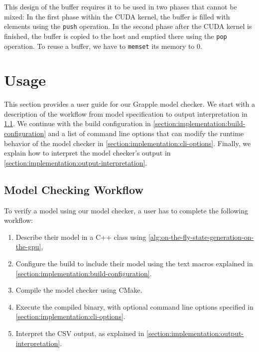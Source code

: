 \documentclass[
fancyheadings, %
%
%
]{stsreprt}
\begin{document}
This design of the buffer requires it to be used in two phases that cannot be mixed:
In the first phase within the CUDA kernel, the buffer is filled with elements using the \texttt{push} operation.
In the second phase after the CUDA kernel is finished, the buffer is copied to the host and emptied there using the \texttt{pop} operation.
To reuse a buffer, we have to \texttt{memset} its memory to 0.

\section{Usage}
\label{section:implementation:usage}

This section provides a user guide for our Grapple model checker.
We start with a description of the workflow from model specification to output interpretation in \cref{section:implementation:model-checking-workflow}.
We continue with the build configuration in \cref{section:implementation:build-configuration} and a list of command line options that can modify the runtime behavior of the model checker in \cref{section:implementation:cli-options}.
Finally, we explain how to interpret the model checker's output in \cref{section:implementation:output-interpretation}.

\subsection{Model Checking Workflow}
\label{section:implementation:model-checking-workflow}

To verify a model using our model checker, a user has to complete the following workflow:

\begin{enumerate}
    \item Describe their model in a C++ class using \cref{alg:on-the-fly-state-generation-on-the-gpu},
    \item Configure the build to include their model using the text macros explained in \cref{section:implementation:build-configuration}.
    \item Compile the model checker using CMake.
    \item Execute the compiled binary, with optional command line options specified in \cref{section:implementation:cli-options}.
    \item Interpret the CSV output, as explained in \cref{section:implementation:output-interpretation}.
\end{enumerate}
\end{document}
